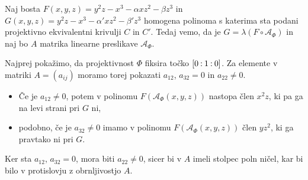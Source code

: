 \documentclass[mat1]{fmfdelo}
\newcommand{\linphi}{\mathcal{A}_\Phi}
\newcommand{\oio}{\pcoor{0: 1 : 0}}
\newcommand{\pcoor}[1]{%
\begingroup\lccode`~=`: \lowercase{\endgroup
\edef~}{\mathbin{\mathchar\the\mathcode`:}\nobreak}%
\left[%
\begingroup
\mathcode`:=\string"8000
#1%
\endgroup
\right]%
}
\theoremstyle{definition}
\begin{document}
\begin{dokaz}
    Naj bosta $F(x,y,z) = y^2z - x^3 - \alpha xz^2 - \beta z^3$ in $G(x, y, z) = y^2z - x^3 - \alpha' xz^2 - \beta' z^3$ homogena polinoma s katerima sta podani projektivno ekvivalentni krivulji $C$ in $C'$. Tedaj vemo, da je $G = \lambda(F \circ \linphi)$ in naj bo $A$ matrika linearne preslikave $\linphi$.
    
    Najprej pokažimo, da projektivnost $\Phi$ fiksira točko $\oio$. Za elemente v matriki $A = (a_{ij})$ moramo torej pokazati $a_{12}$, $a_{32} = 0$ in $a_{22} \neq 0$. 
    \begin{itemize}
        \item Če je $a_{12} \neq 0$, potem v polinomu $F(\linphi(x,y,z))$ nastopa člen $x^2z$, ki pa ga na levi strani pri $G$ ni, 
        \item podobno, če je $a_{32} \neq 0$ imamo v polinomu $F(\linphi(x,y,z))$ člen $yz^2$, ki ga pravtako ni pri $G$. 
    \end{itemize}
    Ker sta $a_{12}$, $a_{32} = 0$, mora biti $a_{22} \neq 0$, sicer bi v $A$ imeli stolpec poln ničel, kar bi bilo v protislovju z obrnljivostjo $A$. 
    

\end{dokaz}
\end{document}
